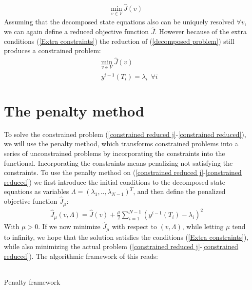 \begin{align*}
\underset{v\in V}{\text{min}} \ \hat J(v)
\end{align*} 
Assuming that the decomposed state equations also can be uniquely resolved $\forall v$, we can again define a reduced objective function  $\hat{J}$. However because of the extra conditions (\ref{Extra constraints}) the reduction of (\ref{decomposed problem}) still produces a constrained problem:
\begin{align}
&\underset{v\in V}{\text{min}} \ \hat J(v) \label{constrained reduced j}\\
&y^{i-1}(T_i)=\lambda_i \ \ \forall i \label{constrained reduced}
\end{align} 
\section{The penalty method} \label{penalty_sec}
To solve the constrained problem (\ref{constrained reduced j}-\ref{constrained reduced}), we will use the penalty method\cite{nocedal2006numerical}, which transforms constrained problems into a series of unconstrained problems by incorporating the constraints into the functional. Incorporating the constraints means penalizing not satisfying the constraints. To use the penalty method on (\ref{constrained reduced j}-\ref{constrained reduced}) we first introduce the initial conditions to the decomposed state equations as variables $\Lambda = (\lambda_1,..,\lambda_{N-1})^T$, and then define the penalized objective function $\hat J_{\mu}$:
\begin{align}
\hat J_{\mu}(v,\Lambda) = \hat J(v) + \frac{\mu}{2}\sum_{i=1}^{N-1}(y^{i-1}(T_i)-\lambda_i)^2 \label{pen_obj_J}
\end{align}
With $\mu>0$. If we now minimize $\hat{J}_{\mu}$ with respect to $(v,\Lambda)$, while letting $\mu$ tend to infinity, we hope that the solution satisfies the conditions (\ref{Extra constraints}), while also minimizing the actual problem (\ref{constrained reduced j}-\ref{constrained reduced}). The algorithmic framework of this reads:
\\
\\
\begin{algorithm}[H]
\caption{Penalty framework\label{PEN_ALG}}
\end{algorithm}
